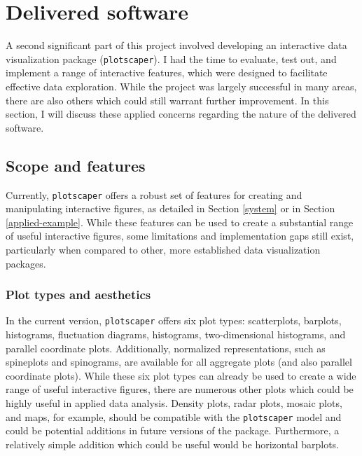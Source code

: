 \documentclass[
  openany]{book}
\theoremstyle{definition}
\theoremstyle{definition}
\theoremstyle{definition}
\theoremstyle{definition}
\theoremstyle{remark}
\begin{document}
\section{Delivered software}\label{delivered-software}

A second significant part of this project involved developing an interactive data visualization package (\texttt{plotscaper}). I had the time to evaluate, test out, and implement a range of interactive features, which were designed to facilitate effective data exploration. While the project was largely successful in many areas, there are also others which could still warrant further improvement. In this section, I will discuss these applied concerns regarding the nature of the delivered software.

\subsection{Scope and features}\label{scope-and-features}

Currently, \texttt{plotscaper} offers a robust set of features for creating and manipulating interactive figures, as detailed in Section \ref{system} or in Section \ref{applied-example}. While these features can be used to create a substantial range of useful interactive figures, some limitations and implementation gaps still exist, particularly when compared to other, more established data visualization packages.

\subsubsection{Plot types and aesthetics}\label{plot-types-and-aesthetics}

In the current version, \texttt{plotscaper} offers six plot types: scatterplots, barplots, histograms, fluctuation diagrams, histograms, two-dimensional histograms, and parallel coordinate plots. Additionally, normalized representations, such as spineplots and spinograms, are available for all aggregate plots (and also parallel coordinate plots). While these six plot types can already be used to create a wide range of useful interactive figures, there are numerous other plots which could be highly useful in applied data analysis. Density plots, radar plots, mosaic plots, and maps, for example, should be compatible with the \texttt{plotscaper} model and could be potential additions in future versions of the package. Furthermore, a relatively simple addition which could be useful would be horizontal barplots.
\end{document}
